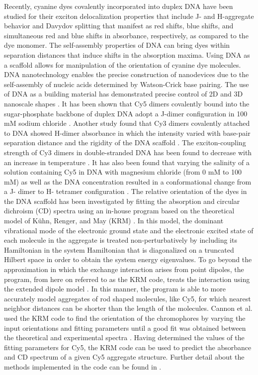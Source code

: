 Recently, cyanine dyes covalently incorporated into duplex DNA have been studied for their exciton delocalization properties that include J- and H-aggregate behavior and Davydov splitting that manifest as red shifts, blue shifts, and simultaneous red and blue shifts in absorbance, respectively, as compared to the dye monomer. The self-assembly properties of DNA can bring dyes within separation distances that induce shifts in the absorption maxima. Using DNA as a scaffold allows for manipulation of the orientation of cyanine dye molecules. DNA nanotechnology enables the precise construction of nanodevices due to the self-assembly of nucleic acids determined by Watson-Crick base pairing. The use of DNA as a building material has demonstrated precise control of 2D and 3D nanoscale shapes \cite{rothemund06, Ke2012a}. It has been shown that Cy5 dimers covalently bound into the sugar-phosphate backbone of duplex DNA adopt a J-dimer configuration in 100 mM sodium chloride \cite{Markova2013}. Another study found that Cy3 dimers covalently attached to DNA showed H-dimer absorbance in which the intensity varied with base-pair separation distance and the rigidity of the DNA scaffold \cite{Nicoli2016b}. The exciton-coupling strength of Cy3 dimers in double-stranded DNA has been found to decrease with an increase in temperature \cite{Kringle2018b}. It has also been found that varying the salinity of a solution containing Cy5 in DNA with magnesium chloride (from 0 mM to 100 mM) as well as the DNA concentration resulted in a conformational change from a J- dimer to H- tetramer configuration \cite{Cannon2017}. The relative orientation of the dyes in the DNA scaffold has been investigated by fitting the absorption and circular dichroism (CD) spectra using an in-house program based on the theoretical model of Kühn, Renger, and May (KRM) \cite{Cannon2017, Cannon2018, Kuhn1996}. In this model, the dominant vibrational mode of the electronic ground state and the electronic excited state of each molecule in the aggregate is treated non-perturbatively by including its Hamiltonian in the system Hamiltonian that is diagonalized on a truncated Hilbert space in order to obtain the system energy eigenvalues. To go beyond the approximation in which the exchange interaction arises from point dipoles, the program, from here on referred to as the KRM code, treats the interaction using the extended dipole model \cite{Czikklely1970}. In this manner, the program is able to more accurately model aggregates of rod shaped molecules, like Cy5, for which nearest neighbor distances can be shorter than the length of the molecules. Cannon et al. used the KRM code to find the orientation of the chromophores by varying the input orientations and fitting parameters until a good fit was obtained between the theoretical and experimental spectra \cite{Cannon2017, Cannon2018}. Having determined the values of the fitting parameters for Cy5, the KRM code can be used to predict the absorbance and CD spectrum of a given Cy5 aggregate structure. Further detail about the methods implemented in the code can be found in \citet{Cannon2017}. 

